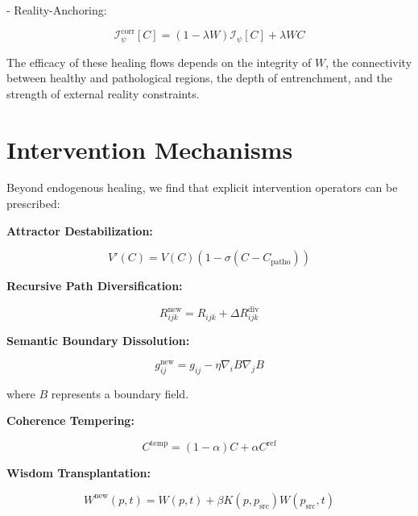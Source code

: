 - Reality-Anchoring:

\begin{equation}
\mathcal{I}_{\psi}^{\text{corr}}[C] = (1-\lambda W)\mathcal{I}_{\psi}[C] + \lambda W C
\end{equation}

The efficacy of these healing flows depends on the integrity of $W$, the connectivity between healthy and pathological regions, the depth of entrenchment, and the strength of external reality constraints.


\section{Intervention Mechanisms}
\label{sec:intervention_mechanisms}

Beyond endogenous healing, we find that explicit intervention operators can be prescribed:

\textbf{Attractor Destabilization:}

\begin{equation}
V'(C) = V(C) (1 - \sigma(C - C_{\text{patho}}))
\end{equation}

\textbf{Recursive Path Diversification:}

\begin{equation}
R_{ijk}^{\text{new}} = R_{ijk} + \Delta R_{ijk}^{\text{div}}
\end{equation}

\textbf{Semantic Boundary Dissolution:}

\begin{equation}
g_{ij}^{\text{new}} = g_{ij} - \eta \nabla_i B \nabla_j B
\end{equation}

where $B$ represents a boundary field.

\textbf{Coherence Tempering:}

\begin{equation}
C^{\text{temp}} = (1-\alpha)C + \alpha C^{\text{ref}}
\end{equation}

\textbf{Wisdom Transplantation:}

\begin{equation}
W^{\text{new}}(p,t) = W(p,t) + \beta K(p,p_{\text{src}}) W(p_{\text{src}},t)
\end{equation}


